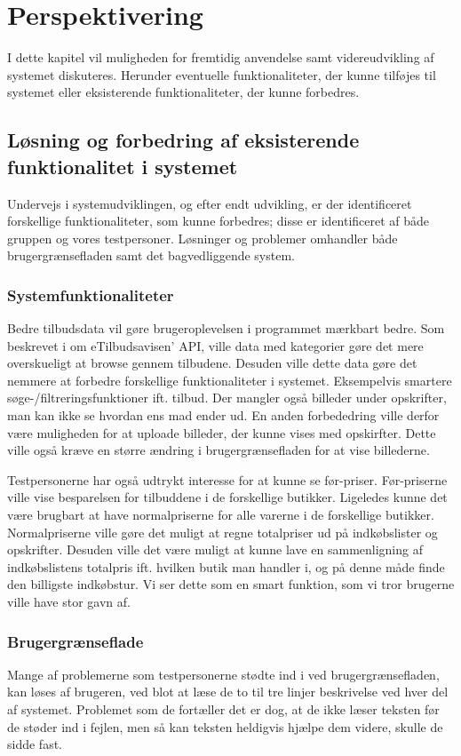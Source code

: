 \chapter{Perspektivering}
I dette kapitel vil muligheden for fremtidig anvendelse samt videreudvikling af systemet diskuteres.
Herunder eventuelle funktionaliteter, der kunne tilføjes til systemet eller eksisterende funktionaliteter, der kunne forbedres.

\section{Løsning og forbedring af eksisterende funktionalitet i systemet}
Undervejs i systemudviklingen, og efter endt udvikling, er der identificeret forskellige funktionaliteter, som kunne forbedres; disse er identificeret af både gruppen og vores testpersoner.
Løsninger og problemer omhandler både brugergrænsefladen samt det bagvedliggende system.

\subsection{Systemfunktionaliteter}
Bedre tilbudsdata vil gøre brugeroplevelsen i programmet mærkbart bedre.
Som beskrevet i  om eTilbudsavisen' API, ville data med kategorier gøre det mere overskueligt at browse gennem tilbudene.
Desuden ville dette data gøre det nemmere at forbedre forskellige funktionaliteter i systemet.
Eksempelvis smartere søge-/filtreringsfunktioner ift. tilbud.
Der mangler også billeder under opskrifter, man kan ikke se hvordan ens mad ender ud.
En anden forbededring ville derfor være muligheden for at uploade billeder, der kunne vises med opskirfter. 
Dette ville også kræve en større ændring i brugergrænsefladen for at vise billederne.

Testpersonerne har også udtrykt interesse for at kunne se før-priser.
Før-priserne ville vise besparelsen for tilbuddene i de forskellige butikker.
Ligeledes kunne det være brugbart at have normalpriserne for alle varerne i de forskellige butikker.
Normalpriserne ville gøre det muligt at regne totalpriser ud på indkøbslister og opskrifter.
Desuden ville det være muligt at kunne lave en sammenligning af indkøbslistens totalpris ift. hvilken butik man handler i, og på denne måde finde den billigste indkøbstur.
Vi ser dette som en smart funktion, som vi tror brugerne ville have stor gavn af.

\subsection{Brugergrænseflade}
Mange af problemerne som testpersonerne stødte ind i ved brugergrænsefladen, kan løses af brugeren, ved blot at læse de to til tre linjer beskrivelse ved hver del af systemet.
Problemet som de fortæller det er dog, at de ikke læser teksten før de støder ind i fejlen, men så kan teksten heldigvis hjælpe dem videre, skulle de sidde fast.

